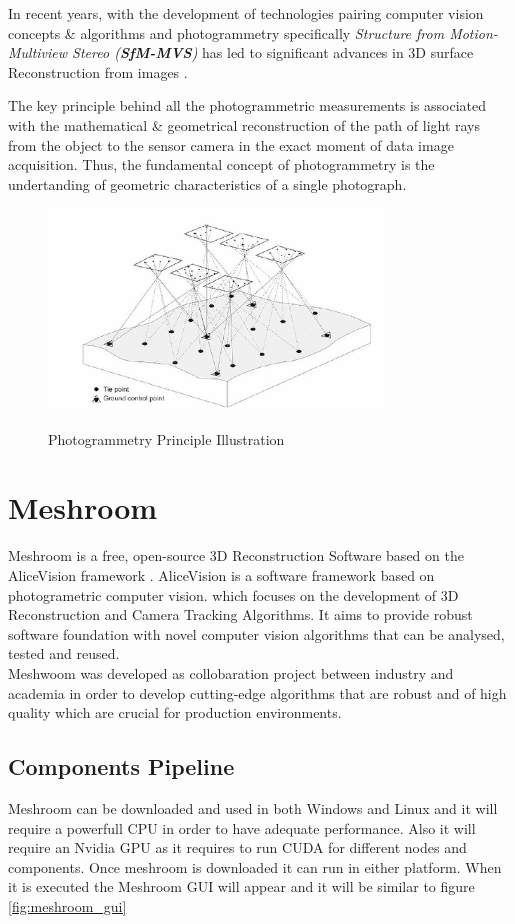\documentclass[12pt]{report}
\begin{document}
In recent years, with the development of technologies pairing computer vision concepts \& algorithms and photogrammetry specifically \textit{Structure from Motion-Multiview Stereo (\textbf{SfM-MVS})}
has led to significant advances in 3D surface Reconstruction from images .

The key principle behind all the photogrammetric measurements is associated with the mathematical \& geometrical reconstruction of the path of light rays from the object to the sensor camera in the exact moment of data image acquisition.
Thus, the fundamental concept of photogrammetry is the undertanding of geometric characteristics of a single photograph.

\begin{figure}[h]
  \centering
  \includegraphics[width=0.8\textwidth]{photogrammetry.png}
  \caption{Photogrammetry Principle Illustration}\cite[]{photogrammetry_def}
  \label{fig:photogrammetry_principle} 
\end{figure}

\section{Meshroom}
Meshroom is a free, open-source 3D Reconstruction Software based on the AliceVision framework .
AliceVision is a software framework based on photogrametric computer vision.  which focuses on the development of 3D Reconstruction and Camera Tracking Algorithms.
It aims to provide robust software foundation with novel computer vision algorithms that can be analysed, tested and reused.\\
Meshwoom was developed as collobaration project between industry and academia in order to develop cutting-edge algorithms that are robust and of high quality which are crucial for production environments.

\subsection{Components Pipeline}
Meshroom can be downloaded and used in both Windows and Linux and it will require a powerfull CPU in order to have adequate performance. Also it will require an Nvidia GPU as it requires to run CUDA for different nodes and components.
Once meshroom is downloaded it can run in either platform. When it is executed the Meshroom GUI will appear and it will be similar to figure \ref{fig:meshroom_gui}
\end{document}
